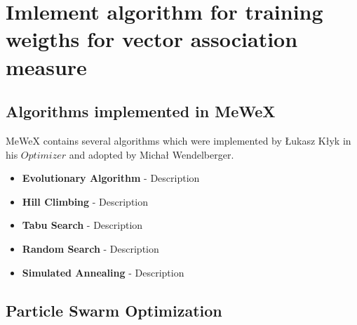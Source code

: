 \chapter{Imlement algorithm for training weigths for vector association measure}

\section{Algorithms implemented in MeWeX}
MeWeX contains several algorithms which were implemented by Łukasz Kłyk in his \(Optimizer\) and adopted by 
Michał Wendelberger.





\begin{itemize}
    \item \textbf{Evolutionary Algorithm} - Description
 
    \item \textbf{Hill Climbing} - Description
 
    \item \textbf{Tabu Search} - Description
 
    \item \textbf{Random Search} - Description
 
    \item \textbf{Simulated Annealing} - Description 
\end{itemize}

\section{Particle Swarm Optimization}

